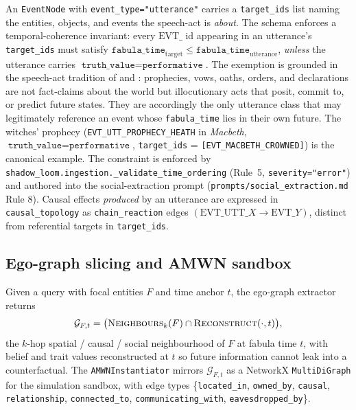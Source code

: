 \documentclass[11pt]{article}
\begin{document}
An \texttt{EventNode} with \texttt{event\_type="utterance"} carries
a \texttt{target\_ids} list naming the entities, objects, and
events the speech-act is \emph{about}. The schema enforces a
temporal-coherence invariant: every $\mathrm{EVT}\_$ id appearing
in an utterance's \texttt{target\_ids} must satisfy
$\texttt{fabula\_time}_{\text{target}} \le
\texttt{fabula\_time}_{\text{utterance}}$, \emph{unless} the
utterance carries $\texttt{truth\_value} = \texttt{performative}$.
The exemption is grounded in the speech-act tradition of
\citet{austin1962how} and \citet{searle1969speech}: prophecies,
vows, oaths, orders, and declarations are not fact-claims about
the world but illocutionary acts that posit, commit to, or
predict future states. They are accordingly the only utterance
class that may legitimately reference an event whose
\texttt{fabula\_time} lies in their own future. The witches'
prophecy (\texttt{EVT\_UTT\_PROPHECY\_HEATH} in
\emph{Macbeth}, $\texttt{truth\_value}=\texttt{performative}$,
\texttt{target\_ids} = \texttt{[EVT\_MACBETH\_CROWNED]}) is the
canonical example. The constraint is enforced by
\texttt{shadow\_loom.ingestion.\_validate\_time\_ordering} (Rule~5,
\texttt{severity="error"}) and authored into the social-extraction
prompt (\texttt{prompts/social\_extraction.md} Rule 8).
Causal effects \emph{produced} by an utterance are expressed in
\texttt{causal\_topology} as \texttt{chain\_reaction} edges
$(\mathrm{EVT}\_\mathrm{UTT}\_X \to \mathrm{EVT}\_Y)$, distinct
from referential targets in \texttt{target\_ids}.

\subsection{Ego-graph slicing and AMWN sandbox}
\label{app:amwn}

Given a query with focal entities $F$ and time anchor $t$, the
ego-graph extractor returns
\[
\mathcal{G}_{F,t} = \big(\textsc{Neighbours}_k(F) \cap
\textsc{Reconstruct}(\cdot, t)\big),
\]
the $k$-hop spatial / causal / social neighbourhood of $F$ at
fabula time $t$, with belief and trait values reconstructed at
$t$ so future information cannot leak into a counterfactual. The
\texttt{AMWNInstantiator} mirrors $\mathcal{G}_{F,t}$ as a
NetworkX \texttt{MultiDiGraph} for the simulation sandbox, with
edge types \{\texttt{located\_in}, \texttt{owned\_by},
\texttt{causal}, \texttt{relationship}, \texttt{connected\_to},
\texttt{communicating\_with}, \texttt{eavesdropped\_by}\}.
\end{document}
